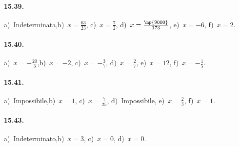\paragraph{15.39.}
a)~Indeterminata,\quad b)~$x=\frac{63}{23}$, \quad c)~$x=\frac{7}{2}$, \quad d)~$x=\frac{\np{9000}}{173}$, \quad e)~$x=-6$, \quad f)~$x=2$.

\paragraph{15.40.}
a)~$x=-{\frac{20}{3}}$,\quad b)~$x=-2$, \quad c)~$x=-{\frac{3}{7}}$, \quad d)~$x=\frac{2}{7}$, \quad e)~$x=12$, \quad f)~$x=-{\frac{1}{5}}$.

\paragraph{15.41.}
a)~Impossibile,\quad b)~$x=1$, \quad c)~$x=\frac{7}{25}$, \quad d)~Impossibile, \quad e)~$x=\frac{2}{3}$, \quad f)~$x=1$.

\paragraph{15.43.}
a)~Indeterminato,\quad b)~$x=3$, \quad c)~$x=0$, \quad d)~$x=0$.
